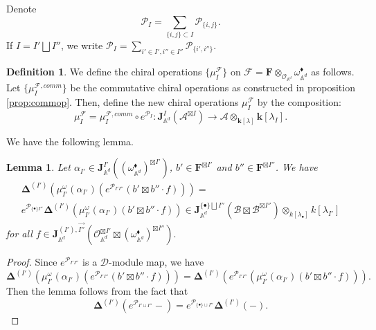 \documentclass[11pt]{amsart}
\newtheorem{lem}[thm]{Lemma}
\theoremstyle{definition}
\newtheorem{defn}[thm]{Definition}
\theoremstyle{remark}
\numberwithin{equation}{section}
\newcommand{\cF}{\mathcal{F}}
\begin{document}
Denote $$ \mathcal{P}_{{I}}=\sum_{\{i,j\}\subset{I}}\mathcal{P}_{\{i,j\}}.
$$
If ${I}={I'}\bigsqcup {I''}$, we write ${\mathcal{P}}_{I}=\sum\limits_{i'\in {I'}, i''\in{I''} }\mathcal{P}_{\{i',i''\}}.$

\begin{defn}
  We define the chiral operations $\{\mu_I^{\mathcal{F}}\}$ on $\mathcal{F}=\mathbf{F}\otimes_{\mathcal{O}_{\mathbb{A}^d}} \omega_{\mathbb{A}^d}^{\blacklozenge}$ as follows.
  Let $\{\mu_I^{\cF,comm}\}$ be the commutative chiral operations as constructed in proposition \ref{prop:commop}.
  Then, define the new chiral operations $\mu_I^{\mathcal{F}}$ by the composition:
$$
\mu^{\mathcal{F}}_{{I}}=\mu^{\mathcal{F},comm}_{I}\circ e^{\mathcal{P}_{{I}}} \colon \mathbf{J}_{\mathbb{A}^d}^{{I}}\left(\mathcal{A}^{\boxtimes{I}} \right)\rightarrow \mathcal{A}\otimes_{\mathbf{k}[\lambda]}\mathbf{k}[\lambda_{I}].
$$
\end{defn}

We have the following lemma.

\begin{lem}
    Let $\alpha_{{I'}}\in \mathbf{J}_{\mathbb{A}^d}^{{I'}}((\omega_{\mathbb{A}^d}^{\blacklozenge})^{\boxtimes {I'}}) $,
    $b'\in \mathbf{F}^{\boxtimes {I'}}$ and $b''\in \mathbf{F}^{\boxtimes {I''}}$. We have
    \begin{multline}
    \mathbf{\Delta}^{(I')}\left(\mu^{\omega}_{{I'}}(\alpha_{{I'}})(    e^{{\mathcal{P}}_{{I'}{I''}}}(b'\boxtimes
    b''\cdot f ))\right)=\\ e^{{\mathcal{P}}_{\{\bullet\}{I''}}}\mathbf{\Delta}^{(I')}\left(\mu^{\omega}_{{I'}}(\alpha_{{I'}})(b'\boxtimes b''\cdot f) \right)\in \mathbf{J}^{\{\bullet\}\bigsqcup{I''}}_{\mathbb{A}^d}(\mathcal{B}\boxtimes \mathcal{B}^{\boxtimes{I''}})\otimes_{k[\lambda_{\bullet}]}k[\lambda_{I'}]
  \end{multline}
    for all $f\in \mathbf{J}^{({I'}),\vec{{I''}}}_{\mathbb{A}^d}(\mathcal{O}_{\mathbb{A}^d}^{\boxtimes{I'}}\boxtimes(\omega_{\mathbb{A}^d}^{\blacklozenge})^{\boxtimes{I''}}).
$
\end{lem}
\begin{proof}
Since $  e^{{\mathcal{P}}_{{I'}{I''}}}$ is a $\mathcal{D}$-module map, we have
$$
\mathbf{\Delta}^{(I')}\left(\mu^{\omega}_{{I'}}(\alpha_{{I'}})(    e^{{\mathcal{P}}_{{I'}{I''}}}(b'\boxtimes b''\cdot f ))\right)=\mathbf{\Delta}^{(I')}\left(e^{{\mathcal{P}}_{{I'}{I''}}}(\mu^{\omega}_{{I'}}(\alpha_{{I'}})(    b'\boxtimes b''\cdot f ))\right).
$$
Then the lemma follows from the fact that
$$
\mathbf{\Delta}^{(I')}\left(e^{{\mathcal{P}}_{I' \sqcup I''}}-\right)=e^{{\mathcal{P}}_{\{\bullet\} \sqcup I''}}\mathbf{\Delta}^{(I')}\left(-\right).
$$
\iffalse

    This follows from the following observation
    $$
    \lambda^s_{i'}\cdot \left(b'\boxtimes b''\cdot f\cdot e^{\overleftarrow{\mathcal{P}}_{\vec{I'}\vec{I''}}}\right)=\partial_{z^s_{i'}}b'\boxtimes b''\cdot f\cdot e^{\overleftarrow{\mathcal{P}}_{\vec{I'}\vec{I''}}}+b'\boxtimes b''\cdot e^{\overleftarrow{\mathcal{P}}_{\vec{I'}\vec{I''}}}\cdot \lambda^s_{i'} \cdot f.
    $$
\fi

\end{proof}
\end{document}
